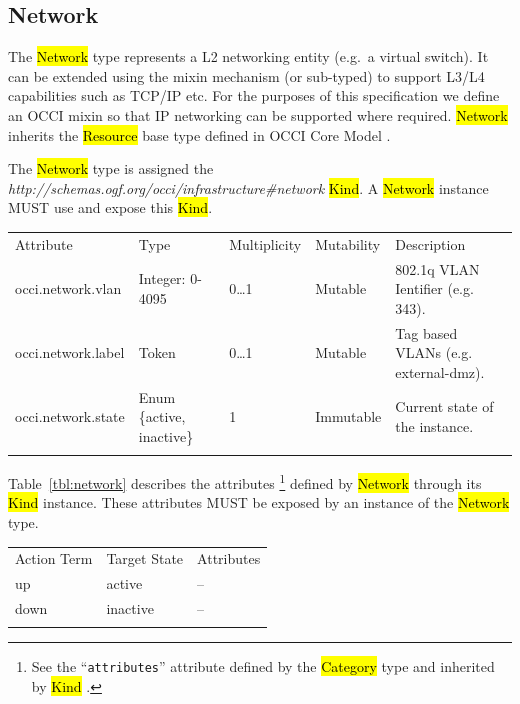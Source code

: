 \documentclass[10pt,a4paper]{article}
\begin{document}
\subsection{Network}
The \hl{Network} type represents a L2 networking entity (e.g.~a virtual switch).
%
It can be extended using 
the mixin mechanism (or sub-typed) to support L3/L4 capabilities such as TCP/IP etc. 
For the purposes of this specification we define an OCCI mixin so that IP networking can be supported
where required. 
%
\hl{Network} inherits the \hl{Resource} base type defined in OCCI Core Model \cite{occi:core}.

The \hl{Network} type is assigned the
\textit{http://schemas.ogf.org/occi/infrastructure\#network} \hl{Kind}. A
\hl{Network} instance MUST use and expose this \hl{Kind}.

{
	\begin{tabular}{lllll}
	\toprule
	Attribute&Type&Multi\-plicity&Mutability&Description\\
	\colrule
	occi.network.vlan & Integer: 0-4095 & 0\ldots1 & Mutable 
	& 802.1q VLAN Ientifier (e.g. 343).\\
	occi.network.label & Token & 0\ldots1 & Mutable 
	& Tag based VLANs (e.g. external-dmz).\\
	occi.network.state & Enum \{active, inactive\} & 1 & Immutable 
	& Current state of the instance.\\
	\botrule
	\end{tabular}
}
Table~\ref{tbl:network} describes the attributes%
\footnote{See the ``{\tt attributes}'' attribute defined by the \hl{Category}
type and inherited by \hl{Kind} \cite{occi:core}.} 
defined by \hl{Network} through its \hl{Kind} instance. These attributes
MUST be exposed by an instance of the \hl{Network} type.

{
	\begin{tabular}{lll}
	\toprule
	Action Term&Target State&Attributes\\
	\colrule
	up & active & --\\
	down & inactive & --\\
	\botrule
	\end{tabular}
}
\end{document}
